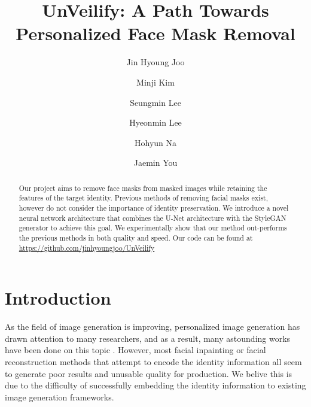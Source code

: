 \documentclass[sigconf,authorversion,nonacm]{acmart}
\begin{document}
\title{UnVeilify: A Path Towards Personalized Face Mask Removal}

\author{Jin Hyoung Joo}

\author{Minji Kim}

\author{Seungmin Lee}

\author{Hyeonmin Lee}

\author{Hohyun Na}

\author{Jaemin You}

\begin{abstract}
    Our project aims to remove face masks from masked images while retaining the features
    of the target identity. Previous methods of removing facial masks exist,
    however do not consider the importance of identity preservation. We introduce
    a novel neural network architecture that combines the U-Net architecture with
    the StyleGAN generator to achieve this goal. We experimentally show that our method
    out-performs the previous methods in both quality and speed. Our code can be found at
    \url{https://github.com/jinhyoungjoo/UnVeilify}
\end{abstract}

\maketitle

\section{Introduction}
As the field of image generation is improving,
personalized image generation has drawn attention to many researchers, and as a
result, many astounding works have been done on this topic \cite{InstantBooth, SubjectDiffusion}.
However, most facial inpainting or facial reconstruction methods that attempt to encode the identity information \cite{SymmFC, IPFC, RGLSRI} all seem to
generate poor results and unusable quality for production. We belive this is due to the difficulty of successfully embedding the identity information to existing image generation frameworks.
\end{document}
